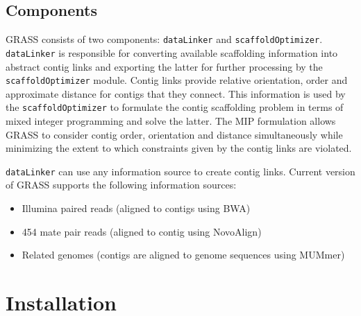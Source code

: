 \documentclass[12pt, a4paper]{report}
\begin{document}
\section{Components}
GRASS consists of two components: \verb=dataLinker= and \verb=scaffoldOptimizer=. \verb=dataLinker= is responsible for converting available scaffolding information into abstract contig links and exporting the latter for further processing by the \verb=scaffoldOptimizer= module. Contig links provide relative orientation, order and approximate distance for contigs that they connect. This information is used by the \verb=scaffoldOptimizer= to formulate the contig scaffolding problem in terms of mixed integer programming and solve the latter. The MIP formulation allows GRASS to consider contig order, orientation and distance simultaneously while minimizing the extent to which constraints given by the contig links are violated.

\verb=dataLinker= can use any information source to create contig links. Current version of GRASS supports the following information sources:
\begin{itemize}
\item Illumina paired reads (aligned to contigs using BWA)
\item 454 mate pair reads (aligned to contig using NovoAlign)
\item Related genomes (contigs are aligned to genome sequences using MUMmer)
\end{itemize}

\chapter{Installation}
\end{document}
